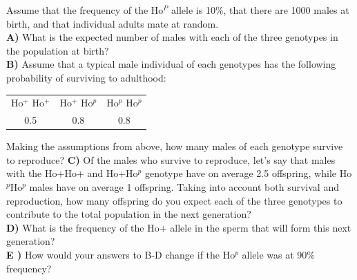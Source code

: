 \begin{question}
Assume that the frequency of the Ho$^P$ allele is 10\%, that there are 1000 males at birth, and that individual adults mate at random.\\
{\bf A)} What is the expected number of males with each of the three genotypes in the population at birth? \\

{\bf B)} Assume that a typical male individual of each genotypes has the following probability of surviving to adulthood:\\
\begin{tabular}{ccc}
Ho$^+$ Ho$^+$ & Ho$^+$ Ho$^p$ & Ho$^p$ Ho$^p$ \\
0.5 & 0.8 & 0.8
\end{tabular}

Making the assumptions from above,  how many males of each genotype survive to reproduce? 
{\bf C)} Of the males who survive to reproduce, let's say that males with the Ho+Ho+  and Ho+Ho$^p$  genotype have on average 2.5 offspring, while Ho$^p$Ho$^p$ males have on average 1 offspring. Taking into account both survival and reproduction, how many offspring do you expect each of the three genotypes to contribute to the total population in the next generation? \\

{\bf D)} What is the frequency of the Ho+ allele in the sperm that will form this next generation?  \\
{\bf E )} How would your answers to B-D change if the Ho$^p$ allele was at 90\% frequency? \\
\end{question}

